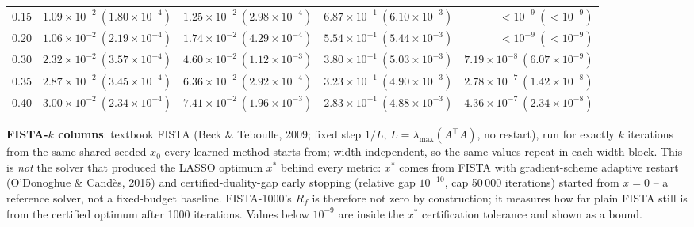 \begin{table}[htbp]
\begin{tabular}{@{} l rrrr @{}}
0.15 & $1.09\!\times\!10^{-2}\ (1.80\!\times\!10^{-4})$ & $1.25\!\times\!10^{-2}\ (2.98\!\times\!10^{-4})$ & $6.87\!\times\!10^{-1}\ (6.10\!\times\!10^{-3})$ & $<\!10^{-9}\ (<\!10^{-9})$ \\
0.20 & $1.06\!\times\!10^{-2}\ (2.19\!\times\!10^{-4})$ & $1.74\!\times\!10^{-2}\ (4.29\!\times\!10^{-4})$ & $5.54\!\times\!10^{-1}\ (5.44\!\times\!10^{-3})$ & $<\!10^{-9}\ (<\!10^{-9})$ \\
0.30 & $2.32\!\times\!10^{-2}\ (3.57\!\times\!10^{-4})$ & $4.60\!\times\!10^{-2}\ (1.12\!\times\!10^{-3})$ & $3.80\!\times\!10^{-1}\ (5.03\!\times\!10^{-3})$ & $7.19\!\times\!10^{-8}\ (6.07\!\times\!10^{-9})$ \\
0.35 & $2.87\!\times\!10^{-2}\ (3.45\!\times\!10^{-4})$ & $6.36\!\times\!10^{-2}\ (2.92\!\times\!10^{-4})$ & $3.23\!\times\!10^{-1}\ (4.90\!\times\!10^{-3})$ & $2.78\!\times\!10^{-7}\ (1.42\!\times\!10^{-8})$ \\
0.40 & $3.00\!\times\!10^{-2}\ (2.34\!\times\!10^{-4})$ & $7.41\!\times\!10^{-2}\ (1.96\!\times\!10^{-3})$ & $2.83\!\times\!10^{-1}\ (4.88\!\times\!10^{-3})$ & $4.36\!\times\!10^{-7}\ (2.34\!\times\!10^{-8})$ \\
\bottomrule
\end{tabular}
\vspace{2pt}
\begin{minipage}{\linewidth}\footnotesize
\textbf{FISTA-$k$ columns}: textbook FISTA (Beck \& Teboulle, 2009; fixed step $1/L$, $L = \lambda_{\max}(A^\top A)$, no restart), run for exactly $k$ iterations from the same shared seeded $x_0$ every learned method starts from; width-independent, so the same values repeat in each width block. This is \emph{not} the solver that produced the LASSO optimum $x^*$ behind every metric: $x^*$ comes from FISTA with gradient-scheme adaptive restart (O'Donoghue \& Cand\`es, 2015) and certified-duality-gap early stopping (relative gap $10^{-10}$, cap 50\,000 iterations) started from $x = 0$ -- a reference solver, not a fixed-budget baseline. FISTA-1000's $R_f$ is therefore not zero by construction; it measures how far plain FISTA still is from the certified optimum after 1000 iterations. Values below $10^{-9}$ are inside the $x^*$ certification tolerance and shown as a bound.
\end{minipage}
\end{table}

